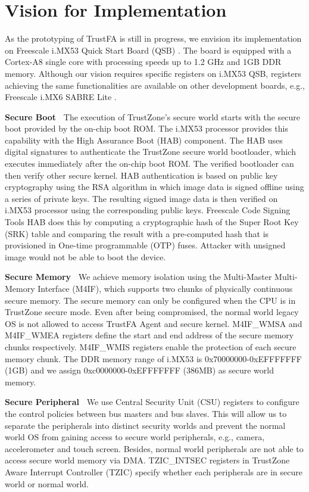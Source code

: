 \section{Vision for Implementation}
\label{sec:implementation}

As the prototyping of TrustFA is still in progress, we envision its
implementation on Freescale i.MX53 Quick Start Board (QSB) \cite{imx53qsb}. The
board is equipped with a Cortex-A8 single core with processing speeds up to 1.2
GHz and 1GB DDR memory.  Although our vision requires specific registers on i.MX53 QSB, registers
achieving the same functionalities are available on other development boards,
e.g., Freescale i.MX6 SABRE Lite \cite{imx6sabrelite}.

\noindent
{\bf Secure Boot~}
The execution of TrustZone's secure world starts with the secure boot provided
by the on-chip boot ROM. The i.MX53 processor provides this capability with the
High Assurance Boot (HAB) component.  The HAB uses digital
signatures to authenticate the TrustZone secure world bootloader, which executes
immediately after the on-chip boot ROM. The verified bootloader can then verify
other secure kernel. HAB authentication is based on public key cryptography
using the RSA algorithm in which image data is signed offline using a series of
private keys. The resulting signed image data is then verified on i.MX53
processor using the corresponding public keys. Freescale Code Signing Tools HAB
does this by computing a cryptographic hash of the Super Root Key (SRK) table
and comparing the result with a pre-computed hash that is provisioned in
One-time programmable (OTP) fuses. Attacker with unsigned image would not be
able to boot the device.

\noindent
{\bf Secure Memory~}
We achieve memory isolation using the Multi-Master Multi-Memory Interface
(M4IF), which supports two chunks of physically continuous secure memory. The
secure memory can only be configured when the CPU is in TrustZone secure mode.
Even after being compromised, the normal world legacy OS is not allowed to
access TrustFA Agent and secure kernel. M4IF\_WMSA and M4IF\_WMEA registers
define the start and end address of the secure memory chunks respectively.
M4IF\_WMIS registers enable the protection of each secure memory chunk. The DDR
memory range of i.MX53 is 0x70000000-0xEFFFFFFF (1GB) and we assign
0xc0000000-0xEFFFFFFF (386MB) as secure world memory.

\noindent
{\bf Secure Peripheral~}
We use Central Security Unit (CSU) registers to configure the control policies
between bus masters and bus slaves. This will allow us to separate the
peripherals into distinct security worlds and prevent the normal world OS from
gaining access to secure world peripherals, e.g., camera, accelerometer and
touch screen. Besides, normal world peripherals are not able to access secure
world memory via DMA. TZIC\_INTSEC registers in TrustZone Aware Interrupt
Controller (TZIC) specify whether each peripherals are in secure world or normal
world.

